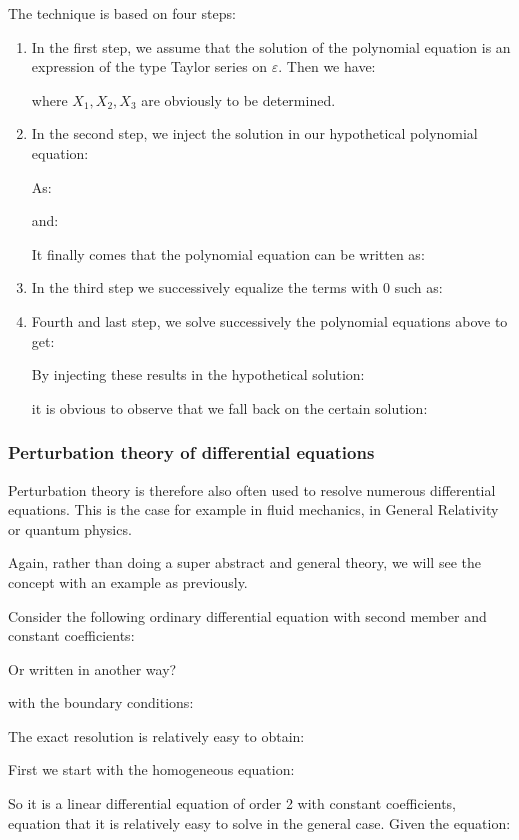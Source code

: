 	The technique is based on four steps:
	\begin{enumerate}
		\item In the first step, we assume that the solution of the polynomial equation is an expression of the type Taylor series on $\varepsilon$. Then we have:
		
		where $X_1,X_2,X_3$ are obviously to be determined.
		\item In the second step, we inject the solution in our hypothetical polynomial equation:
		
		As:
		
		and:
		
		It finally comes that the polynomial equation can be written as:
		
		
		\item In the third step we successively equalize the terms with 0 such as:
		
		\item Fourth and last step, we solve successively the polynomial equations above to get:
		
		By injecting these results in the hypothetical solution:
		
		it is obvious to observe that we fall back on the certain solution:
		
	\end{enumerate}
	
	\pagebreak
	\subsubsection{Perturbation theory of differential equations}
	Perturbation theory is therefore also often used to resolve numerous differential equations. This is the case for example in fluid mechanics, in General Relativity or quantum physics.
	
	Again, rather than doing a super abstract and general theory, we will see the concept with an example as previously.
	
	Consider the following ordinary differential equation with second member and constant coefficients:
	
	Or written in another way?
	
	with the boundary conditions:
	
	The exact resolution is relatively easy to obtain:
	
	First we start with the homogeneous equation:
	
	So it is a linear differential equation of order 2 with constant coefficients, equation that it is relatively easy to solve in the general case. Given the equation:
	

